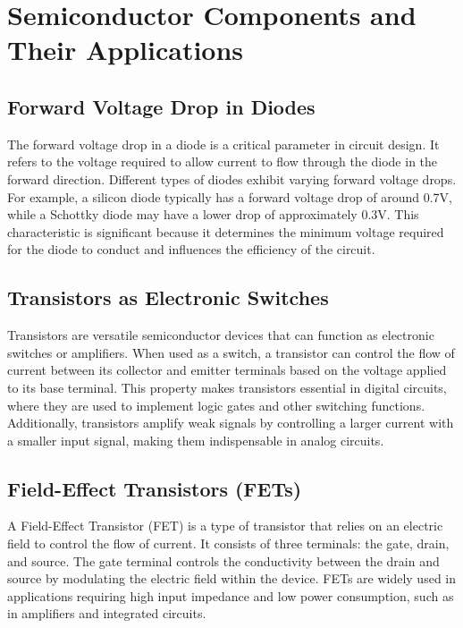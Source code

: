 \section{Semiconductor Components and Their Applications}
\label{section:semiconductor_components}

\subsection*{Forward Voltage Drop in Diodes}
The forward voltage drop in a diode is a critical parameter in circuit design. It refers to the voltage required to allow current to flow through the diode in the forward direction. Different types of diodes exhibit varying forward voltage drops. For example, a silicon diode typically has a forward voltage drop of around 0.7V, while a Schottky diode may have a lower drop of approximately 0.3V. This characteristic is significant because it determines the minimum voltage required for the diode to conduct and influences the efficiency of the circuit.

\subsection*{Transistors as Electronic Switches}
Transistors are versatile semiconductor devices that can function as electronic switches or amplifiers. When used as a switch, a transistor can control the flow of current between its collector and emitter terminals based on the voltage applied to its base terminal. This property makes transistors essential in digital circuits, where they are used to implement logic gates and other switching functions. Additionally, transistors amplify weak signals by controlling a larger current with a smaller input signal, making them indispensable in analog circuits.

\subsection*{Field-Effect Transistors (FETs)}
A Field-Effect Transistor (FET) is a type of transistor that relies on an electric field to control the flow of current. It consists of three terminals: the gate, drain, and source. The gate terminal controls the conductivity between the drain and source by modulating the electric field within the device. FETs are widely used in applications requiring high input impedance and low power consumption, such as in amplifiers and integrated circuits.

